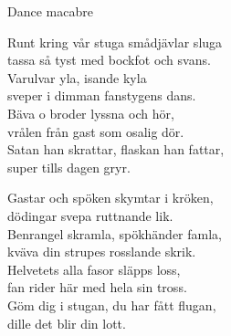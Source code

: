 \begin{song}{Dance macabre}
	
	
	
	Runt kring vår stuga smådjävlar sluga\\
	tassa så tyst med bockfot och svans.\\
	Varulvar yla, isande kyla\\
	sveper i dimman fanstygens dans.\\
	Bäva o broder lyssna och hör,\\
	vrålen från gast som osalig dör.\\
	Satan han skrattar, flaskan han fattar,\\
	super tills dagen gryr.
	
	Gastar och spöken skymtar i kröken,\\
	dödingar svepa ruttnande lik.\\
	Benrangel skramla, spökhänder famla,\\
	kväva din strupes rosslande skrik.\\
	Helvetets alla fasor släpps loss,\\
	fan rider här med hela sin tross.\\
	Göm dig i stugan, du har fått flugan,\\
	dille det blir din lott.
	
\end{song}
